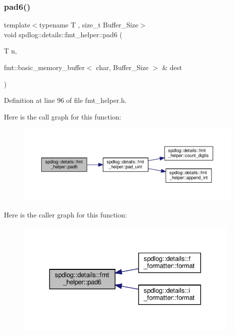 \subsubsection{\texorpdfstring{pad6()}{pad6()}}
{\footnotesize\ttfamily template$<$typename T , size\+\_\+t Buffer\+\_\+\+Size$>$ \\
void spdlog\+::details\+::fmt\+\_\+helper\+::pad6 (\begin{DoxyParamCaption}\item[{T}]{n,  }\item[{fmt\+::basic\+\_\+memory\+\_\+buffer$<$ char, Buffer\+\_\+\+Size $>$ \&}]{dest }\end{DoxyParamCaption})\hspace{0.3cm}{\ttfamily [inline]}}



Definition at line 96 of file fmt\+\_\+helper.\+h.

Here is the call graph for this function\+:
\nopagebreak
\begin{figure}[H]
\begin{center}
\leavevmode
\includegraphics[width=350pt]{namespacespdlog_1_1details_1_1fmt__helper_aefae60b1ebdae78bc8f11c26b36b2cd6_cgraph}
\end{center}
\end{figure}
Here is the caller graph for this function\+:
\nopagebreak
\begin{figure}[H]
\begin{center}
\leavevmode
\includegraphics[width=311pt]{namespacespdlog_1_1details_1_1fmt__helper_aefae60b1ebdae78bc8f11c26b36b2cd6_icgraph}
\end{center}
\end{figure}
\mbox{\label{namespacespdlog_1_1details_1_1fmt__helper_aad467c706932b56929dae091b39c23f3}} 
